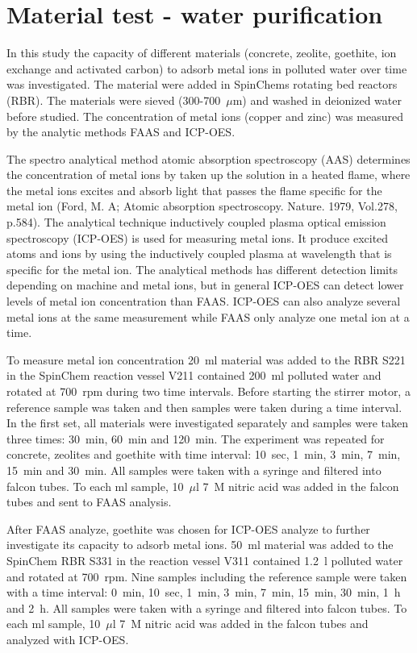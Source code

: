 \section{Material test - water purification}
In this study the capacity of different materials (concrete, zeolite, goethite,
ion exchange and activated carbon) to adsorb metal ions in polluted water over
time was investigated. The material were added in SpinChems rotating
bed reactors (RBR). The materials were sieved (300-700~$\mu$m) and washed in
deionized water before studied. The concentration of metal ions (copper and
zinc) was measured by the analytic methods FAAS and ICP-OES.

The spectro analytical method atomic absorption spectroscopy (AAS) determines
the concentration of metal ions by taken up the solution in a heated flame,
where the metal ions excites and absorb light that passes the flame specific
for the metal ion (Ford, M. A; Atomic absorption spectroscopy. Nature. 1979,
Vol.278, p.584). The analytical technique inductively coupled plasma optical
emission spectroscopy (ICP-OES) is used for measuring metal ions. It produce
excited atoms and ions by using the inductively coupled plasma at wavelength
that is specific for the metal ion. The analytical methods has
different detection limits depending on machine and metal ions, but in general
ICP-OES can detect lower levels of metal ion concentration than FAAS. ICP-OES
can also analyze several metal ions at the same measurement while FAAS only
analyze one metal ion at a time.

To measure metal ion concentration 20~ml material was added to the
RBR S221 in the SpinChem reaction vessel V211 contained 200~ml polluted water
and rotated at 700~rpm during two time intervals. Before starting the stirrer
motor, a reference sample was taken and then samples were taken during a time
interval. In the first set, all materials were investigated separately and
samples were taken three times: 30~min, 60~min and 120~min. The experiment was
repeated for concrete, zeolites and goethite with time interval: 10~sec, 1~min,
3~min, 7~min, 15~min and 30~min. All samples were taken with a syringe and
filtered into falcon tubes. To each ml sample, 10~$\mu$l 7~M nitric acid was added
in the falcon tubes and sent to FAAS analysis.

After FAAS analyze, goethite was chosen for ICP-OES analyze to further
investigate its capacity to adsorb metal ions. 50~ml material was added to the
SpinChem RBR S331 in the reaction vessel V311 contained 1.2~l
polluted water and rotated at 700~rpm. Nine samples including the reference
sample were taken with a time interval: 0~min, 10~sec, 1~min, 3~min, 7~min, 15~min,
30~min, 1~h and 2~h. All samples were taken with a syringe and filtered
into falcon tubes. To each ml sample, 10~$\mu$l 7~M nitric acid was added in the
falcon tubes and analyzed with ICP-OES.

